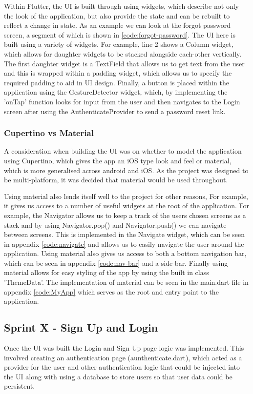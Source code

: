 \documentclass[12pt]{article}
\begin{document}
	Within Flutter, the UI is built through using widgets, which describe not only the look of the application, but also provide the state and can be rebuilt to reflect a change in state. As an example we can look at the forgot password screen, a segment of which is shown in \ref{code:forgot-password}. The UI here is built using a variety of widgets. For example, line 2 shows a Column widget, which allows for daughter widgets to be stacked alongside each-other vertically. The first daughter widget is a TextField that allows us to get text from the user and this is wrapped within a padding widget, which allows us to specify the required padding to aid in UI design. Finally, a button is placed within the application using the GestureDetector widget, which, by implementing the 'onTap' function looks for input from the user and then navigates to the Login screen after using the AuthenticateProvider to send a password reset link.  
	
	
	\subsubsection{Cupertino vs Material}
	A consideration when building the UI was on whether to model the application using Cupertino, which gives the app an iOS type look and feel or material, which is more generalised across android and iOS. As the project was designed to be multi-platform, it was decided that material would be used throughout. 
	
	Using material also lends itself well to the project for other reasons, For example, it gives us access to a number of useful widgets at the root of the application. For example, the Navigator allows us to keep a track of the users chosen screens as a stack and by using Navigator.pop() and Navigator.push() we can navigate between screens. This is implemented in the Navigate widget, which can be seen in appendix \ref{code:navigate} and allows us to easily navigate the user around the application. Using material also gives us access to both a bottom navigation bar, which can be seen in appendix \ref{code:nav-bar} and a side bar. Finally using material allows for easy styling of the app by using the built in class 'ThemeData'. The implementation of material can be seen in the main.dart file in appendix \ref{code:MyApp} which serves as the root and entry point to the application.
	
	
	
	\subsection{Sprint X - Sign Up and Login}
	Once the UI was built the Login and Sign Up page logic was implemented. This involved creating an authentication page (aunthenticate.dart), which acted as a provider for the user and other authentication logic that could be injected into the UI along with using a database to store users so that user data could be persistent.
	
\end{document}
